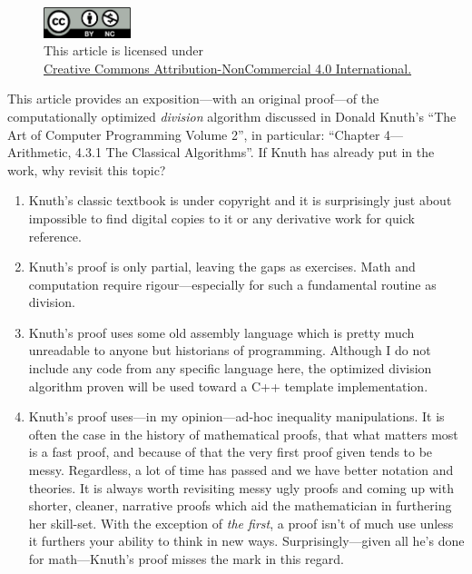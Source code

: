 \documentclass[twoside]{article}
\begin{document}
\begin{figure}[h]
\centering
\includegraphics[width=1in]{../../../cc-by-nc.png}\\[0.1in]
\tiny This article is licensed under \\
\href{http://creativecommons.org/licenses/by-nc/4.0/}
{Creative Commons Attribution-NonCommercial 4.0 International.}\\[0.3in]
\end{figure}

This article provides an exposition---with an original proof---of the computationally optimized \emph{division}
algorithm discussed in Donald Knuth's ``The Art of Computer Programming Volume 2'', in particular: ``Chapter 4---Arithmetic,
4.3.1 The Classical Algorithms''.  If Knuth has already put in the work, why revisit this topic?

\begin{enumerate}
\item Knuth's classic textbook is under copyright and it is surprisingly just about impossible to find digital copies to
	it or any derivative work for quick reference.
\item Knuth's proof is only partial, leaving the gaps as exercises. Math and computation require rigour---especially
	for such a fundamental routine as division.
\item Knuth's proof uses some old assembly language which is pretty much unreadable to anyone but historians of programming.
	Although I do not include any code from any specific language here, the optimized division algorithm proven will be
	used toward a C++ template implementation.
\item Knuth's proof uses---in my opinion---ad-hoc inequality manipulations. It is often the case in the history of mathematical
	proofs, that what matters most is a fast proof, and because of that the very first proof given tends to be messy.
	Regardless, a lot of time has passed and we have better notation and theories. It is always worth revisiting messy
	ugly proofs and coming up with shorter, cleaner, narrative proofs which aid the mathematician in furthering her skill-set.
	With the exception of \emph{the first}, a proof isn't of much use unless it furthers your ability to think in new ways.
	Surprisingly---given all he's done for math---Knuth's proof misses the mark in this regard.
\end{enumerate}
\end{document}
